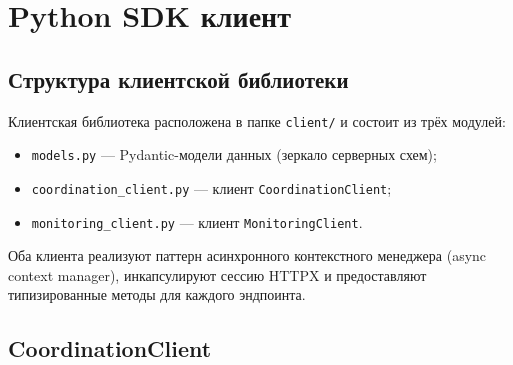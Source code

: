 \documentclass[12pt,a4paper]{article}
\begin{document}
\section{Python SDK клиент}

\subsection{Структура клиентской библиотеки}

Клиентская библиотека расположена в папке \texttt{client/} и состоит из трёх
модулей:

\begin{itemize}
    \item \texttt{models.py} --- Pydantic-модели данных (зеркало серверных схем);
    \item \texttt{coordination\_client.py} --- клиент \texttt{CoordinationClient};
    \item \texttt{monitoring\_client.py} --- клиент \texttt{MonitoringClient}.
\end{itemize}

Оба клиента реализуют паттерн асинхронного контекстного менеджера (async context
manager), инкапсулируют сессию HTTPX и предоставляют типизированные методы для
каждого эндпоинта.

\subsection{CoordinationClient}
\end{document}

